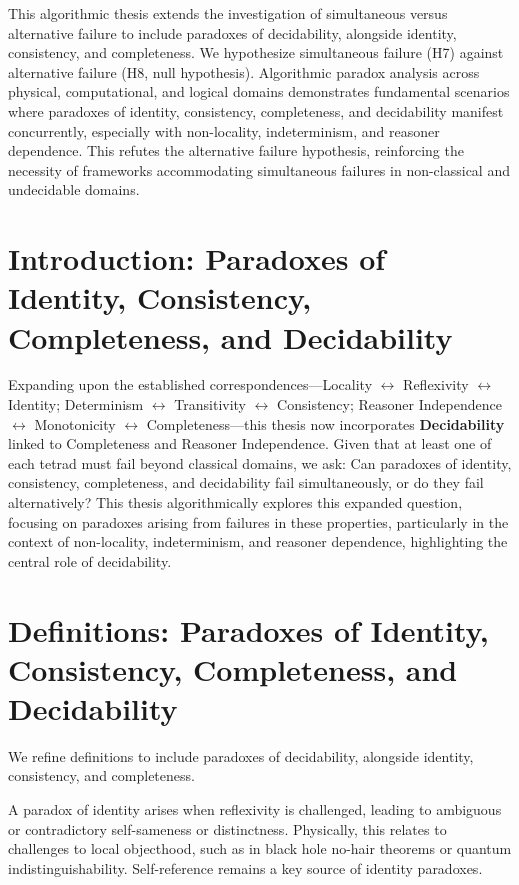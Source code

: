 	


		This algorithmic thesis extends the investigation of simultaneous versus alternative failure to include paradoxes of decidability, alongside identity, consistency, and completeness. We hypothesize simultaneous failure (H7) against alternative failure (H8, null hypothesis).  Algorithmic paradox analysis across physical, computational, and logical domains demonstrates fundamental scenarios where paradoxes of identity, consistency, completeness, and decidability manifest concurrently, especially with non-locality, indeterminism, and reasoner dependence. This refutes the alternative failure hypothesis, reinforcing the necessity of frameworks accommodating simultaneous failures in non-classical and undecidable domains.

	
	\section{Introduction: Paradoxes of Identity, Consistency, Completeness, and Decidability}
	
	Expanding upon the established correspondences—Locality $\leftrightarrow$ Reflexivity $\leftrightarrow$ Identity; Determinism $\leftrightarrow$ Transitivity $\leftrightarrow$ Consistency; Reasoner Independence $\leftrightarrow$ Monotonicity $\leftrightarrow$ Completeness—this thesis now incorporates \textbf{Decidability} linked to Completeness and Reasoner Independence.  Given that at least one of each tetrad must fail beyond classical domains, we ask: Can paradoxes of identity, consistency, completeness, and decidability fail simultaneously, or do they fail alternatively?  This thesis algorithmically explores this expanded question, focusing on paradoxes arising from failures in these properties, particularly in the context of non-locality, indeterminism, and reasoner dependence, highlighting the central role of decidability.
	
	\section{Definitions: Paradoxes of Identity, Consistency, Completeness, and Decidability}
	
	We refine definitions to include paradoxes of decidability, alongside identity, consistency, and completeness.
	
	\begin{definition}
		A paradox of identity arises when reflexivity is challenged, leading to ambiguous or contradictory self-sameness or distinctness. Physically, this relates to challenges to local objecthood, such as in black hole no-hair theorems or quantum indistinguishability. Self-reference remains a key source of identity paradoxes.
	\end{definition}
	
